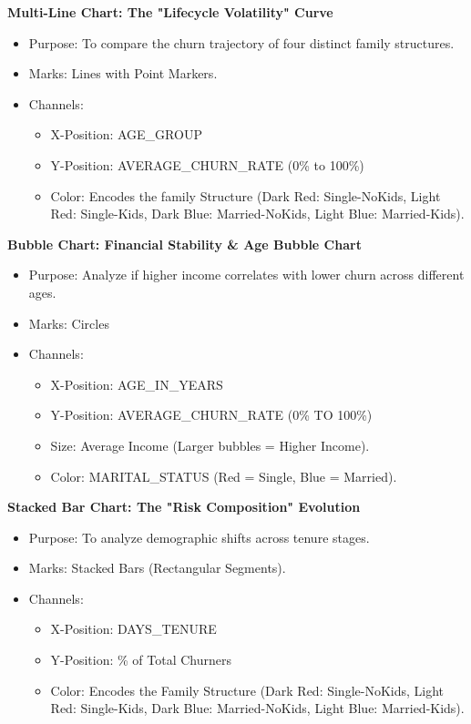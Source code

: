 \documentclass[10pt,a4paper]{article}
\begin{document}
\textbf{Multi-Line Chart: The "Lifecycle Volatility" Curve}
\begin{itemize}[itemsep=0pt]
    \item Purpose: To compare the churn trajectory of four distinct family structures.
    \item Marks: Lines with Point Markers.
    \item Channels:
    \begin{itemize}[itemsep=0pt]
        \item X-Position: AGE\_GROUP
        \item Y-Position: AVERAGE\_CHURN\_RATE (0\% to 100\%)
        \item Color: Encodes the family Structure (Dark Red: Single-NoKids, Light Red: Single-Kids, Dark Blue: Married-NoKids, Light Blue: Married-Kids).
    \end{itemize}
\end{itemize}

\textbf{Bubble Chart: Financial Stability \& Age Bubble Chart}
\begin{itemize}[itemsep=0pt]
    \item Purpose: Analyze if higher income correlates with lower churn across different ages.
    \item Marks: Circles
    \item Channels:
    \begin{itemize}[itemsep=0pt]
        \item X-Position: AGE\_IN\_YEARS
        \item Y-Position: AVERAGE\_CHURN\_RATE (0\% TO 100\%)
        \item Size: Average Income (Larger bubbles = Higher Income).
        \item Color: MARITAL\_STATUS (Red = Single, Blue = Married).
    \end{itemize}
\end{itemize}

\textbf{Stacked Bar Chart: The "Risk Composition" Evolution}
\begin{itemize}[itemsep=0pt]
    \item Purpose: To analyze demographic shifts across tenure stages.
    \item Marks: Stacked Bars (Rectangular Segments).
    \item Channels:
    \begin{itemize}[itemsep=0pt]
        \item X-Position: DAYS\_TENURE 
        \item Y-Position: \% of Total Churners 
        \item Color: Encodes the Family Structure (Dark Red: Single-NoKids, Light Red: Single-Kids, Dark Blue: Married-NoKids, Light Blue: Married-Kids).
    \end{itemize}
\end{itemize}
\end{document}

